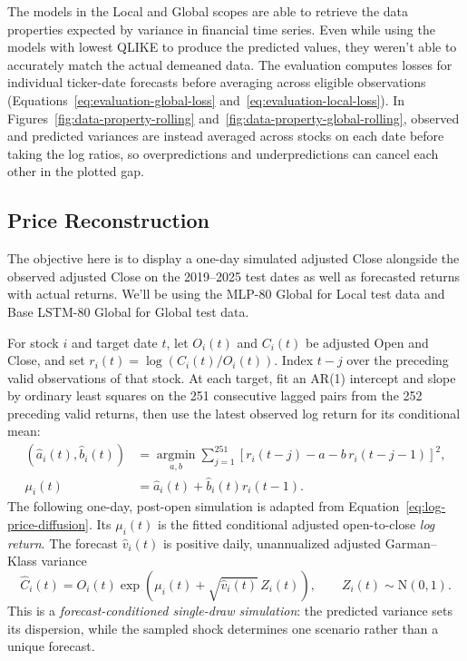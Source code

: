 \documentclass[12pt,a4paper]{article}
\numberwithin{equation}{section}
\numberwithin{table}{section}
\numberwithin{figure}{section}
\begin{document}
The models in the Local and Global scopes are able to retrieve the data properties expected by variance in financial time series. Even while using the models with lowest QLIKE to produce the predicted values, they weren't able to accurately match the actual demeaned data. The evaluation computes losses for individual ticker-date forecasts before averaging across eligible observations (Equations~\eqref{eq:evaluation-global-loss} and~\eqref{eq:evaluation-local-loss}). In Figures~\ref{fig:data-property-rolling} and~\ref{fig:data-property-global-rolling}, observed and predicted variances are instead averaged across stocks on each date before taking the log ratios, so overpredictions and underpredictions can cancel each other in the plotted gap. 

\subsection{Price Reconstruction}
The objective here is to display a one-day simulated adjusted Close alongside the observed adjusted Close on the 2019--2025 test dates as well as forecasted returns with actual returns. We'll be using the MLP-80 Global for Local test data and Base LSTM-80 Global for Global test data. 

For stock $i$ and target date $t$, let $O_i(t)$ and $C_i(t)$ be adjusted Open and Close, and set $r_i(t)=\log(C_i(t)/O_i(t))$. Index $t-j$ over the preceding valid observations of that stock. At each target, fit an AR(1) intercept and slope by ordinary least squares on the 251 consecutive lagged pairs from the 252 preceding valid returns, then use the latest observed log return for its conditional mean:
\begin{equation}\label{eq:price-reconstruction-drift}
\begin{aligned}
(\widehat a_i(t),\widehat b_i(t))
&=\underset{a,b}{\operatorname{argmin}}\sum_{j=1}^{251}
\left[r_i(t-j)-a-b\,r_i(t-j-1)\right]^2,\\
\mu_i(t)&=\widehat a_i(t)+\widehat b_i(t)r_i(t-1).
\end{aligned}
\end{equation}
The following one-day, post-open simulation is adapted from Equation~\eqref{eq:log-price-diffusion}. Its $\mu_i(t)$ is the fitted conditional adjusted open-to-close \emph{log return}. The forecast $\widehat v_i(t)$ is positive daily, unannualized adjusted Garman--Klass variance
\begin{equation}\label{eq:price-reconstruction-simulation}
\widehat C_i(t)=O_i(t)\exp\!\left(\mu_i(t)+\sqrt{\widehat v_i(t)}\,Z_i(t)\right),
\qquad Z_i(t)\sim\mathrm N(0,1).
\end{equation}
This is a \emph{forecast-conditioned single-draw simulation}: the predicted variance sets its dispersion, while the sampled shock determines one scenario rather than a unique forecast. 
\end{document}
